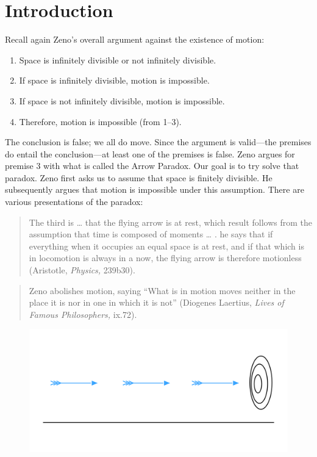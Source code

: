 \documentclass[oneside]{article}
\begin{document}
\thispagestyle{fancy}



\section*{Introduction}
Recall again Zeno's overall argument against the existence of motion:
\begin{enumerate}
\item Space is infinitely divisible or not infinitely divisible.
\item  If space is infinitely divisible, motion is impossible.
\item  If space is not infinitely divisible, motion is impossible.
\item  Therefore, motion is impossible (from 1--3).
\end{enumerate}
The conclusion is false; we all do move. Since the argument is valid---the premises do entail the conclusion---at least one of the premises is false. Zeno argues for premise 3 with what is called the Arrow Paradox. Our goal is to try solve that paradox. Zeno first asks us to assume that space is finitely divisible. He subsequently argues that motion is impossible under this assumption.  There are various presentations of the paradox: 
\begin{quote}
The third is \ldots{} that the flying arrow is at rest, which result
follows from the assumption that time is composed of moments \ldots{} .
he says that if everything when it occupies an equal space is at rest,
and if that which is in locomotion is always in a now, the flying arrow
is therefore motionless (Aristotle, \emph{Physics,} 239b30).
\end{quote}
\begin{quote}
Zeno abolishes motion, saying ``What is in motion moves neither in the
place it is nor in one in which it is not'' (Diogenes Laertius, \emph{Lives of
Famous Philosophers,} ix.72).
\end{quote}
\begin{figure}[h]
\centering
  \includegraphics[width=\linewidth]{arrow.png}
\end{figure}
\end{document}
